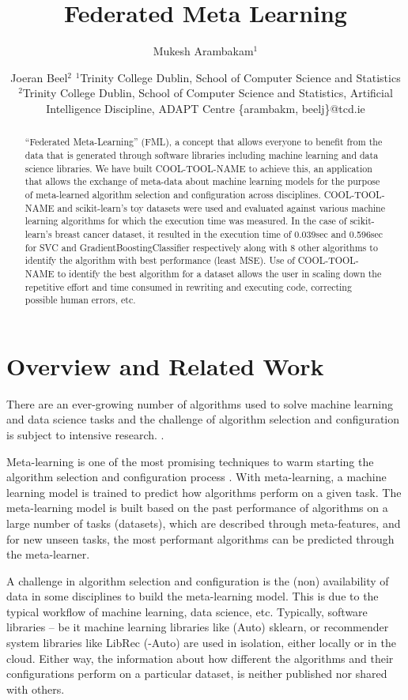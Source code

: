 \documentclass{article}
\title{Federated Meta Learning}
\author{
Mukesh Arambakam$^1$
\and
Joeran Beel$^2$
\affiliations
$^1$Trinity College Dublin,
School of Computer Science and Statistics\\
$^2$Trinity College Dublin,
School of Computer Science and Statistics,
Artificial Intelligence Discipline,
ADAPT Centre
\emails
\{arambakm, beelj\}@tcd.ie
}
\begin{document}
\maketitle

\begin{abstract}
“Federated Meta-Learning” (FML), a concept that allows everyone to benefit from the data that is generated through software libraries including machine learning and data science libraries. We have built COOL-TOOL-NAME to achieve this, an application that allows the exchange of meta-data about machine learning models for the purpose of meta-learned algorithm selection and configuration across disciplines.
COOL-TOOL-NAME and scikit-learn's toy datasets were used and evaluated against various machine learning algorithms for which the execution time was measured. In the case of scikit-learn’s breast cancer dataset, it resulted in the execution time of 0.039sec and 0.596sec for SVC and GradientBoostingClassifier respectively along with 8 other algorithms to identify the algorithm with best performance (least MSE). Use of COOL-TOOL-NAME to identify the best algorithm for a dataset allows the user in scaling down the repetitive effort and time consumed in rewriting and executing code, correcting possible human errors, etc.
\end{abstract}

\section{Overview and Related Work}
There are an ever-growing number of algorithms used to solve machine learning and data science tasks and the challenge of algorithm selection and configuration is subject to intensive research. \cite{bischl-et-al,brazdil:p,calandra-et-al,collins-et-al2018,cunha-et-al2017,edenhofer-et-al,ferrari-et-al,hutter-et-al,kotthoff:l,lindauer-et-al,romero-et-al,tu:w,vartak-et-al}.

Meta-learning is one of the most promising techniques to warm starting the algorithm selection and configuration process \cite{hutter-et-al}. With meta-learning, a machine learning model is trained to predict how algorithms perform on a given task. The meta-learning model is built based on the past performance of algorithms on a large number of tasks (datasets), which are described through meta-features, and for new unseen tasks, the most performant algorithms can be predicted through the meta-learner.

A challenge in algorithm selection and configuration is the (non) availability of data in some disciplines to build the meta-learning model. This is due to the typical workflow of machine learning, data science, etc. Typically, software libraries – be it machine learning libraries like (Auto) sklearn, or recommender system libraries like LibRec (-Auto) are used in isolation, either locally or in the cloud. Either way, the information about how different the algorithms and their configurations perform on a particular dataset, is neither published nor shared with others.
\end{document}
